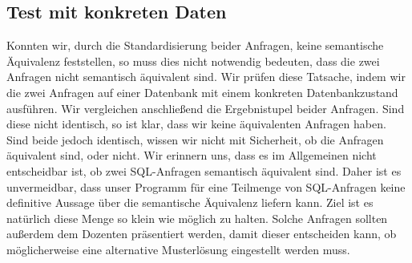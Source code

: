 


\subsection{Test mit konkreten Daten}

Konnten wir, durch die Standardisierung beider Anfragen, keine semantische Äquivalenz feststellen, so muss dies nicht notwendig bedeuten, dass die zwei Anfragen nicht semantisch äquivalent sind. Wir prüfen diese Tatsache, indem wir die zwei Anfragen auf einer Datenbank mit einem konkreten Datenbankzustand ausführen. Wir vergleichen anschließend die Ergebnistupel beider Anfragen. Sind diese nicht identisch, so ist klar, dass wir keine äquivalenten Anfragen haben. Sind beide jedoch identisch, wissen wir nicht mit Sicherheit, ob die Anfragen äquivalent sind, oder nicht. Wir erinnern uns, dass es im Allgemeinen nicht entscheidbar ist, ob zwei SQL-Anfragen semantisch äquivalent sind. Daher ist es unvermeidbar, dass unser Programm für eine Teilmenge von SQL-Anfragen keine definitive Aussage über die semantische Äquivalenz liefern kann. Ziel ist es natürlich diese Menge so klein wie möglich zu halten. Solche Anfragen sollten außerdem dem Dozenten präsentiert werden, damit dieser entscheiden kann, ob möglicherweise eine alternative Musterlösung eingestellt werden muss.



